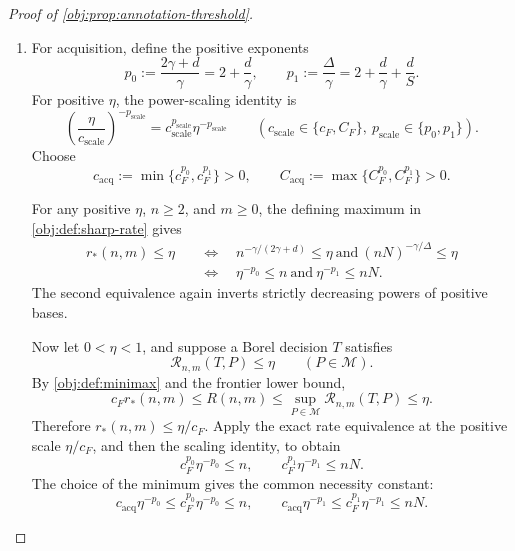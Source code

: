 \documentclass[11pt]{article}
\begin{document}
\begin{proof}[Proof of \cref{obj:prop:annotation-threshold}]
\begin{enumerate}
The remaining sample sizes are \(n=0\) and \(n=1\). At \(n=1\), all power bases equal one, so both the benchmark and \(r_*(1,0)\) equal one. At zero, the numerical formulas use the convention
\[
0^{t_{\mathrm{pow}}}=0
\qquad
\bigl(t_{\mathrm{pow}}\in\mathbb R\setminus\{0\}\bigr).
\]
All exponents occurring here are strictly negative:
\[
-\frac{\gamma}{2\gamma+d}<0,
\qquad
-\frac{\gamma}{\Delta}<0,
\qquad
-\frac{2\gamma}{\Delta}<0.
\]
Thus both branches of the benchmark equal zero at \(n=0\), and the two terms in the maximum defining \(r_*(0,0)\) also equal zero. This proves the benchmark equality for every \(n\in\mathbb N\), with the stated formulas for \(n\ge1\).

\item
For acquisition, define the positive exponents
\[
p_0:=\frac{2\gamma+d}{\gamma}
=2+\frac d\gamma,
\qquad
p_1:=\frac{\Delta}{\gamma}
=2+\frac d\gamma+\frac dS.
\]
For positive \(\eta\), the power-scaling identity is
\[
\left(\frac{\eta}{c_{\mathrm{scale}}}\right)^{-p_{\mathrm{scale}}}
=
c_{\mathrm{scale}}^{p_{\mathrm{scale}}}
\eta^{-p_{\mathrm{scale}}}
\qquad
\left(
c_{\mathrm{scale}}\in\{c_F,C_F\},\
p_{\mathrm{scale}}\in\{p_0,p_1\}
\right).
\]
Choose
\[
c_{\mathrm{acq}}
:=\min\{c_F^{p_0},c_F^{p_1}\}>0,
\qquad
C_{\mathrm{acq}}
:=\max\{C_F^{p_0},C_F^{p_1}\}>0.
\]

For any positive \(\eta\), \(n\ge2\), and \(m\ge0\), the defining maximum in
\cref{obj:def:sharp-rate} gives
\[
\begin{aligned}
r_*(n,m)\le\eta
&\quad\Longleftrightarrow\quad
n^{-\gamma/(2\gamma+d)}\le\eta
\ \text{and}\
(nN)^{-\gamma/\Delta}\le\eta\\
&\quad\Longleftrightarrow\quad
\eta^{-p_0}\le n
\ \text{and}\
\eta^{-p_1}\le nN.
\end{aligned}
\]
The second equivalence again inverts strictly decreasing powers of positive bases.

Now let \(0<\eta<1\), and suppose a Borel decision \(T\) satisfies
\[
\mathcal R_{n,m}(T,P)\le\eta
\qquad(P\in\mathcal M).
\]
By \cref{obj:def:minimax} and the frontier lower bound,
\[
c_F r_*(n,m)\le R(n,m)
\le\sup_{P\in\mathcal M}\mathcal R_{n,m}(T,P)
\le\eta.
\]
Therefore \(r_*(n,m)\le\eta/c_F\). Apply the exact rate equivalence at the positive scale \(\eta/c_F\), and then the scaling identity, to obtain
\[
c_F^{p_0}\eta^{-p_0}\le n,
\qquad
c_F^{p_1}\eta^{-p_1}\le nN.
\]
The choice of the minimum gives the common necessity constant:
\[
c_{\mathrm{acq}}\eta^{-p_0}
\le c_F^{p_0}\eta^{-p_0}\le n,
\qquad
c_{\mathrm{acq}}\eta^{-p_1}
\le c_F^{p_1}\eta^{-p_1}\le nN.
\]


\end{enumerate}
\end{proof}
\end{document}
